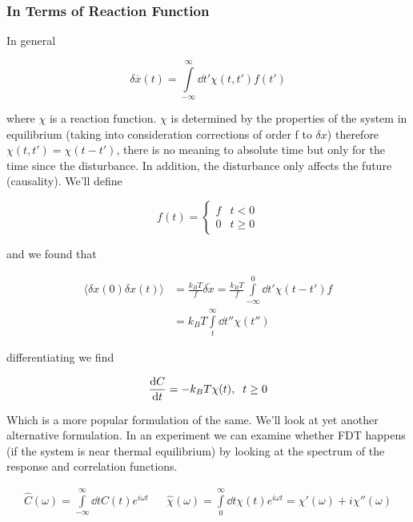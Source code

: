 
\newpage
\subsubsection{In Terms of Reaction Function}

In general

\begin{equation}
	\delta \overline{x}(t) = \int\limits_{-\infty}^\infty \dd t' \chi (t,t') f(t')
\end{equation}

where $\chi$ is a reaction function. $\chi$ is determined by the properties of the system in equilibrium (taking into consideration corrections of order f to $\delta x$) therefore $\chi(t,t') = \chi(t-t')$, there is no meaning to absolute time but only for the time since the disturbance. In addition, the disturbance only affects the future (causality). We'll define

\begin{equation}
	f(t) = \begin{cases}
		f & t<0\\
		0 & t \geq 0
	\end{cases}
\end{equation}

and we found that

\begin{align}
	\langle \delta x(0)\delta x(t)\rangle &= \frac{k_BT}{f}\overline{\delta x} = \frac{k_BT}{f}\int\limits_{-\infty}^0\dd t' \chi(t-t') f\\
	&= k_BT\int\limits_t^\infty\dd t'' \chi(t'')
\end{align}

differentiating we find

\begin{equation}
	\diff{C}{t} = -k_BT\chi(t),\;\;t\geq 0
\end{equation}

Which is a more popular formulation of the same. We'll look at yet another alternative formulation. In an experiment we can examine whether FDT happens (if the system is near thermal equilibrium) by looking at the spectrum of the response and correlation functions.

\begin{align}
	\hat C(\omega) = \int\limits_{-\infty}^{\infty}\dd t C(t)e^{i\omega t} && \hat \chi (\omega) = \int\limits_0^\infty \dd t\chi(t)e^{i\omega t} = \chi'(\omega) + i\chi''(\omega)
\end{align}

